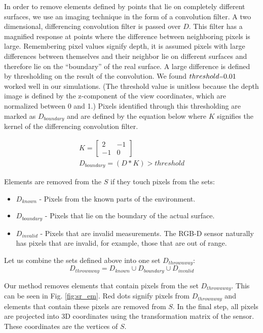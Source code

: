 In order to remove elements defined by points that lie on completely different
surfaces, we use an imaging technique in the form of a convolution filter. A two
dimensional, differencing convolution filter is passed over $D$. This filter has
a magnified response at points where the difference between neighboring pixels
is large. Remembering pixel values signify depth, it is assumed pixels with
large differences between themselves and their neighbor lie on different
surfaces and therefore lie on the ``boundary'' of the real surface. A large
difference is defined by thresholding on the result of the convolution. We found
$threshold\mathsmaller{=}0.01$ worked well in our simulations. (The threshold
value is unitless because the depth image is defined by the z-component of the
view coordinates, which are normalized between 0 and 1.) Pixels identified
through this thresholding are marked as $D_{boundary}$ and are defined by the
equation below where $K$ signifies the kernel of the differencing convolution
filter.

\begin{gather}
  K = \begin{bmatrix} 2 & -1 \\ -1 & 0 \end{bmatrix} \\
  D_{boundary} = (D \ast K) > threshold
\end{gather}

Elements are removed from the $S$ if they touch pixels from the sets:
\begin{itemize}
  \item $D_{known}$ - Pixels from the known parts of the environment.
  \item $D_{boundary}$ - Pixels that lie on the boundary of the actual surface.
  \item $D_{invalid}$ -  Pixels that are invalid measurements. The RGB-D sensor
  naturally has pixels that are invalid, for example, those that are out of
  range.
\end{itemize}

Let us combine the sets defined above into one set $D_{throwaway}$:
\begin{equation}
D_{throwaway} = D_{known} \cup D_{boundary} \cup D_{invalid}
\end{equation}

Our method removes elements that contain pixels from the set $D_{throwaway}$.
This can be seen in Fig. \ref{fig:sr_em}. Red dots signify pixels from
$D_{throwaway}$ and elements that contain these pixels are removed from $S$. In
the final step, all pixels are projected into 3D coordinates using the
transformation matrix of the sensor. These coordinates are the vertices of $S$.

